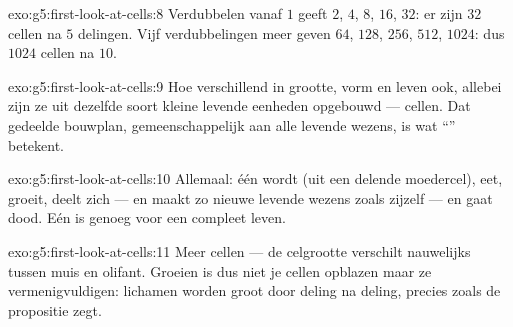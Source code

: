 \begin{solution}{exo:g5:first-look-at-cells:8}
Verdubbelen vanaf $1$ geeft $2$, $4$, $8$, $16$, $32$: er zijn $32$
cellen na $5$ delingen. Vijf verdubbelingen meer geven $64$, $128$,
$256$, $512$, $1024$: dus $1024$ cellen na
$10$.
\end{solution}

\begin{solution}{exo:g5:first-look-at-cells:9}
Hoe verschillend in grootte, vorm en leven ook, allebei zijn ze uit
dezelfde soort kleine levende eenheden opgebouwd --- cellen. Dat
gedeelde bouwplan, gemeenschappelijk aan alle levende wezens, is wat
``'' betekent.
\end{solution}

\begin{solution}{exo:g5:first-look-at-cells:10}
Allemaal: één  wordt  (uit een delende moedercel), eet, groeit,
deelt zich --- en maakt zo nieuwe levende wezens zoals zijzelf --- en
gaat dood. Eén  is genoeg voor een compleet leven.
\end{solution}

\begin{solution}{exo:g5:first-look-at-cells:11}
Meer cellen --- de celgrootte verschilt nauwelijks tussen muis en
olifant. Groeien is dus niet je cellen opblazen maar ze
vermenigvuldigen: lichamen worden groot door deling na deling, precies
zoals de propositie zegt.
\end{solution}
